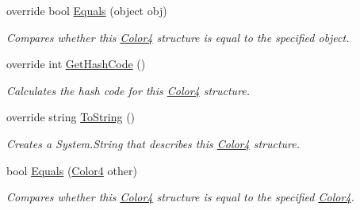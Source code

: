 \begin{DoxyCompactItemize}
override bool \hyperlink{struct_open_t_k_1_1_graphics_1_1_color4_a706766e25cdc1c645130eaedb0c433cd}{Equals} (object obj)
\begin{DoxyCompactList}\small\item\em Compares whether this \hyperlink{struct_open_t_k_1_1_graphics_1_1_color4}{Color4} structure is equal to the specified object. \end{DoxyCompactList}\item 
override int \hyperlink{struct_open_t_k_1_1_graphics_1_1_color4_a19eb954aa74807c617eb41e6e1f179de}{Get\-Hash\-Code} ()
\begin{DoxyCompactList}\small\item\em Calculates the hash code for this \hyperlink{struct_open_t_k_1_1_graphics_1_1_color4}{Color4} structure. \end{DoxyCompactList}\item 
override string \hyperlink{struct_open_t_k_1_1_graphics_1_1_color4_a51959b501a1b349485136b522e5984ce}{To\-String} ()
\begin{DoxyCompactList}\small\item\em Creates a System.\-String that describes this \hyperlink{struct_open_t_k_1_1_graphics_1_1_color4}{Color4} structure. \end{DoxyCompactList}\item 
bool \hyperlink{struct_open_t_k_1_1_graphics_1_1_color4_a23324f0beabfe224bdc2d0143adc90a1}{Equals} (\hyperlink{struct_open_t_k_1_1_graphics_1_1_color4}{Color4} other)
\begin{DoxyCompactList}\small\item\em Compares whether this \hyperlink{struct_open_t_k_1_1_graphics_1_1_color4}{Color4} structure is equal to the specified \hyperlink{struct_open_t_k_1_1_graphics_1_1_color4}{Color4}. \end{DoxyCompactList}\end{DoxyCompactItemize}
